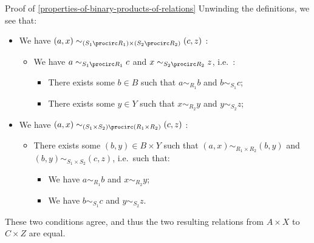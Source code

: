 \begin{Proof}{Proof of \cref{properties-of-binary-products-of-relations}}
    Unwinding the definitions, we see that:
    \begin{itemize}
        \item We have $(a,x)\sim_{(S_{1}\procirc R_{1})\times(S_{2}\procirc R_{2})}(c,z)$ \textiff:
            \begin{itemize}
                \item We have $a\sim_{S_{1}\procirc R_{1}}c$ and $x\sim_{S_{2}\procirc R_{2}}z$, i.e.\ \textiff:
                    \begin{itemize}
                        \item There exists some $b\in B$ such that $a\sim_{R_{1}}b$ and $b\sim_{S_{1}}c$;
                        \item There exists some $y\in Y$ such that $x\sim_{R_{2}}y$ and $y\sim_{S_{2}}z$;
                    \end{itemize}
            \end{itemize}
        \item We have $(a,x)\sim_{(S_{1}\times S_{2})\procirc(R_{1}\times R_{2})}(c,z)$ \textiff:
            \begin{itemize}
                \item There exists some $(b,y)\in B\times Y$ such that $(a,x)\sim_{R_{1}\times R_{2}}(b,y)$ and $(b,y)\sim_{S_{1}\times S_{2}}(c,z)$, i.e.\ such that:
                    \begin{itemize}
                        \item We have $a\sim_{R_{1}}b$ and $x\sim_{R_{2}}y$;
                        \item We have $b\sim_{S_{1}}c$ and $y\sim_{S_{2}}z$.
                    \end{itemize}
            \end{itemize}
    \end{itemize}
    These two conditions agree, and thus the two resulting relations from $A\times X$ to $C\times Z$ are equal.
\end{Proof}
